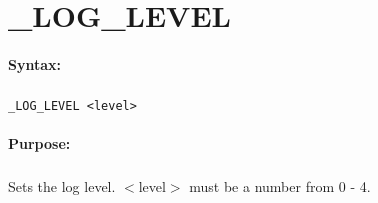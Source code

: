 
\newpage
\section{\_LOG\_LEVEL}
\label{cmd:_LOG_LEVEL}

\paragraph{Syntax:}
\subparagraph{}
\texttt{\_LOG\_LEVEL <level>}

\paragraph{Purpose:}
\subparagraph{}
Sets the log level. $<$level$>$ must be a number 
from 0 - 4.

